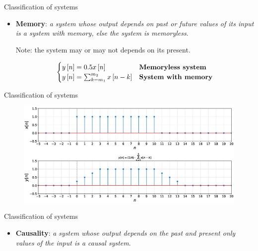 \documentclass[aspectratio=169]{beamer}
\let\olditem\item
\renewcommand{\item}{\setlength{\itemsep}{\fill}\olditem}
\def\ls{\ensuremath\left[}
\def\rs{\ensuremath\right]}
\begin{document}
\begin{frame}[t]{Classification of systems}


\begin{itemize}
\item \textbf{Memory}: \textit{a system whose output depends on past or future values of its input is a system with memory, else the system is memoryless}. 

Note: the system may or may not depends on its present.

\[ \begin{cases}
y\ls n \rs = 0.5x\ls n \rs & \mathrm{\textbf{Memoryless system}} \\
y\ls n \rs = \sum_{k=m_1}^{m_2} x\ls n - k\rs & \mathrm{\textbf{System with memory}}
\end{cases}
\]
\end{itemize}

\end{frame}

\begin{frame}[t]{Classification of systems}

\begin{figure}
\includegraphics[width=\textwidth]{img/memory.eps}
\end{figure}
\end{frame}

\begin{frame}[t]{Classification of systems}

\begin{itemize}
\item \textbf{Causality}: \textit{a system whose output depends on the past and present only values of the input is a causal system}.
\end{itemize}
\end{frame}
\end{document}
